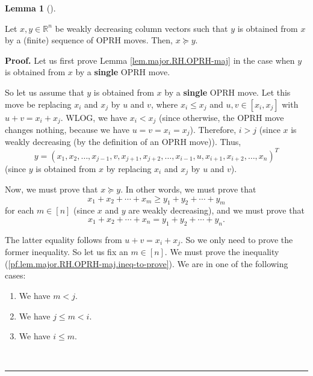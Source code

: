 \documentclass[numbers=enddot,12pt,final,onecolumn,notitlepage]{scrartcl}%
\numberwithin{exer}{subsection}
\theoremstyle{definition}
\newtheorem{lem}[theo]{Lemma}
\newenvironment{lemma}[1][]
{\begin{lem}[#1]\begin{leftbar}}
{\end{leftbar}\end{lem}}
\newenvironment{proof}[1][Proof]{\noindent\textbf{#1.} }{\ \rule{0.5em}{0.5em}}
\begin{document}
\begin{lemma}
\label{lem.major.RH.OPRH-maj}Let $x,y\in\mathbb{R}^{n}$ be weakly decreasing
column vectors such that $y$ is obtained from $x$ by a (finite) sequence of
OPRH moves. Then, $x\succcurlyeq y$.
\end{lemma}

\begin{proof}
Let us first prove Lemma \ref{lem.major.RH.OPRH-maj} in the case when $y$ is
obtained from $x$ by a \textbf{single} OPRH move.

So let us assume that $y$ is obtained from $x$ by a \textbf{single} OPRH move.
Let this move be replacing $x_{i}$ and $x_{j}$ by $u$ and $v$, where
$x_{i}\leq x_{j}$ and $u,v\in\left[  x_{i},x_{j}\right]  $ with $u+v=x_{i}%
+x_{j}$. WLOG, we have $x_{i}<x_{j}$ (since otherwise, the OPRH move changes
nothing, because we have $u=v=x_{i}=x_{j}$). Therefore, $i>j$ (since $x$ is
weakly decreasing (by the definition of an OPRH move)). Thus,%
\[
y=\left(  x_{1},x_{2},\ldots,x_{j-1},v,x_{j+1},x_{j+2},\ldots,x_{i-1}%
,u,x_{i+1},x_{i+2},\ldots,x_{n}\right)  ^{T}%
\]
(since $y$ is obtained from $x$ by replacing $x_{i}$ and $x_{j}$ by $u$ and
$v$).

Now, we must prove that $x\succcurlyeq y$. In other words, we must prove that%
\begin{equation}
x_{1}+x_{2}+\cdots+x_{m}\geq y_{1}+y_{2}+\cdots+y_{m}
\label{pf.lem.major.RH.OPRH-maj.ineq-to-prove}%
\end{equation}
for each $m\in\left[  n\right]  $ (since $x$ and $y$ are weakly decreasing),
and we must prove that%
\begin{equation}
x_{1}+x_{2}+\cdots+x_{n}=y_{1}+y_{2}+\cdots+y_{n}.
\label{pf.lem.major.RH.OPRH-maj.eq-to-prove}%
\end{equation}


The latter equality follows from $u+v=x_{i}+x_{j}$. So we only need to prove
the former inequality. So let us fix an $m\in\left[  n\right]  $. We must
prove the inequality (\ref{pf.lem.major.RH.OPRH-maj.ineq-to-prove}). We are in
one of the following cases:

\begin{enumerate}
\item We have $m<j$.

\item We have $j\leq m<i$.

\item We have $i\leq m$.
\end{enumerate}


\end{proof}
\end{document}
